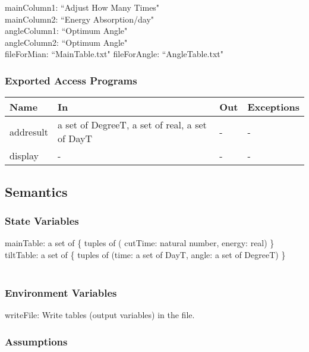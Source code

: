 \documentclass[12pt, titlepage]{article}
\begin{document}
mainColumn1:  ``Adjust How Many Times"\\
mainColumn2: ``Energy Absorption/day"\\
angleColumn1: ``Optimum Angle" \\
angleColumn2: ``Optimum Angle" \\
fileForMian: ``MainTable.txt"
fileForAngle: ``AngleTable.txt"

\subsubsection{Exported Access Programs}

\begin{center}
\begin{tabular}{p{2cm} p{5cm} p{5cm} p{2cm}}
\hline
\textbf{Name} & \textbf{In} & \textbf{Out} & \textbf{Exceptions} \\
\hline 
addresult &  a set of DegreeT, a set of real, a set of DayT & - & - \\
display & - & - & - \\

\hline
\end{tabular}
\end{center}


\subsection{Semantics}

\subsubsection{State Variables}

mainTable: a set of \{ tuples of ( 
cutTime: natural number, energy: real) \}\\
tiltTable: a set of \{ tuples of (time: a set of DayT, angle: a set of DegreeT) \}\\\\


\subsubsection{Environment Variables}
writeFile: Write tables  (output variables) in the file. 

\subsubsection{Assumptions}
\end{document}
